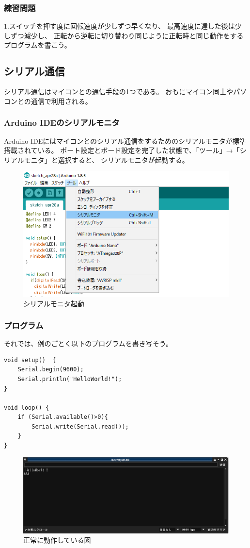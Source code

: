 \documentclass[uplatex]{jsarticle}
\begin{document}
\subsubsection{練習問題}
1.スイッチを押す度に回転速度が少しずつ早くなり、
最高速度に達した後は少しずつ減少し、
正転から逆転に切り替わり同じように正転時と同じ動作をするプログラムを書こう。
\clearpage
\subsection{シリアル通信}
シリアル通信はマイコンとの通信手段の1つである。
おもにマイコン同士やパソコンとの通信で利用される。
\subsubsection{Arduino IDEのシリアルモニタ}
Arduino IDEにはマイコンとのシリアル通信をするためのシリアルモニタが標準搭載されている。
ポート設定とボード設定を完了した状態で、「ツール」→「シリアルモニタ」と選択すると、
シリアルモニタが起動する。
\begin{figure}[htbp]
    \centering
    \includegraphics[width=13cm]{serial_1.png}
    \caption{シリアルモニタ起動}
\end{figure}
\subsubsection{プログラム}
それでは、例のごとく以下のプログラムを書き写そう。
\begin{lstlisting}[basicstyle=\ttfamily\footnotesize, frame=single]
void setup()  {
    Serial.begin(9600);
    Serial.println("HelloWorld!");
}
      
void loop() {
    if (Serial.available()>0){
        Serial.write(Serial.read());
    }
}
\end{lstlisting}
\begin{figure}[htbp]
    \centering
    \includegraphics[width=13cm]{serial_3.png}
    \caption{正常に動作している図}
\end{figure}
\end{document}
